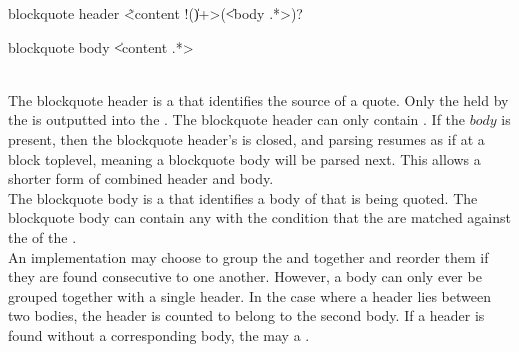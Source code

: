 \begin{identifier}{blockquote header}
\~ <content !(\| )+>(\| <body .*>)?
\end{identifier}
\begin{identifier}{blockquote body}
\| <content .*>
\end{identifier}
 \\

The blockquote header is a  that identifies the source of a quote. Only the  held by the  is outputted into the . The blockquote header  can only contain . If the \inline$body$  is present, then the blockquote header's  is closed, and parsing resumes as if at a block toplevel, meaning a blockquote body will be parsed next. This allows a shorter form of combined header and body. \\

The blockquote body is a  that identifies a body of  that is being quoted. The blockquote body can contain any  with the condition that the  are matched against the  of the . \\

An implementation may choose to group the  and  together and reorder them if they are found consecutive to one another. However, a body can only ever be grouped together with a single header. In the case where a header lies between two bodies, the header is counted to belong to the second body. If a header is found without a corresponding body, the  may  a . \\

